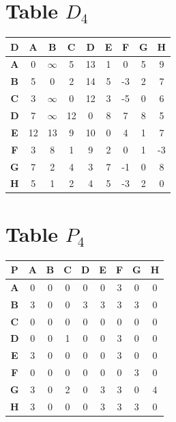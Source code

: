 \documentclass{article}
\begin{document}
\section{Table $D_{4}$}
\begin{center}
    \begin{tabular}{|c||c|c|c|c|c|c|c|c|}
        \hline
        \textbf{D} & \textbf{A} & \textbf{B} & \textbf{C} & \textbf{D} & \textbf{E} & \textbf{F} & \textbf{G} & \textbf{H} \\
        \hline
        \hline
        \textbf{A}& 0 & $\infty$ & 5 & 13 & 1 & 0 & 5 & 9 \\
        \hline
        \textbf{B}& 5 & 0 & 2 & 14 & 5 & -3 & 2 & 7 \\
        \hline
        \textbf{C}& 3 & $\infty$ & 0 & 12 & 3 & -5 & 0 & 6 \\
        \hline
        \textbf{D}& 7 & $\infty$ & 12 & 0 & 8 & 7 & 8 & 5 \\
        \hline
        \textbf{E}& 12 & 13 & 9 & 10 & 0 & 4 & 1 & 7 \\
        \hline
        \textbf{F}& 3 & 8 & 1 & 9 & 2 & 0 & 1 & -3 \\
        \hline
        \textbf{G}& 7 & 2 & 4 & 3 & 7 & -1 & 0 & \cellcolor[HTML]{D74894}$8$ \\
        \hline
        \textbf{H}& 5 & 1 & 2 & 4 & 5 & -3 & 2 & 0 \\
        \hline
    \end{tabular}
\end{center}


\section{Table $P_{4}$}
\begin{center}
    \begin{tabular}{|c||c|c|c|c|c|c|c|c|}
        \hline
        \textbf{P} & \textbf{A} & \textbf{B} & \textbf{C} & \textbf{D} & \textbf{E} & \textbf{F} & \textbf{G} & \textbf{H} \\
        \hline
        \hline
        \textbf{A}& 0 & 0 & 0 & 0 & 0 & 3 & 0 & 0 \\
        \hline
        \textbf{B}& 3 & 0 & 0 & 3 & 3 & 3 & 3 & 0 \\
        \hline
        \textbf{C}& 0 & 0 & 0 & 0 & 0 & 0 & 0 & 0 \\
        \hline
        \textbf{D}& 0 & 0 & 1 & 0 & 0 & 3 & 0 & 0 \\
        \hline
        \textbf{E}& 3 & 0 & 0 & 0 & 0 & 3 & 0 & 0 \\
        \hline
        \textbf{F}& 0 & 0 & 0 & 0 & 0 & 0 & 3 & 0 \\
        \hline
        \textbf{G}& 3 & 0 & 2 & 0 & 3 & 3 & 0 & \cellcolor[HTML]{D74894}$4$ \\
        \hline
        \textbf{H}& 3 & 0 & 0 & 0 & 3 & 3 & 3 & 0 \\
        \hline
    \end{tabular}
\end{center}
\end{document}
